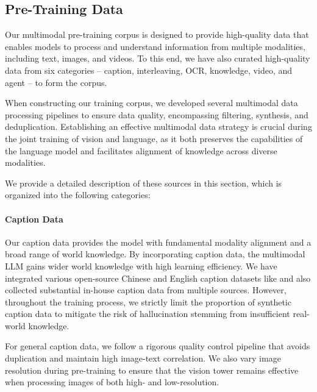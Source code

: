 \documentclass{article}
\newcommand{\citep}[1]{\parencite{#1}}
\begin{document}
\label{sec:data}


\subsection{Pre-Training Data}
\label{sec:pretraindata} %

Our multimodal pre-training corpus is designed to provide high-quality data that enables models to process and understand information from multiple modalities, including text, images, and videos. 
To this end, we have also curated high-quality data from six categories -- caption, interleaving, OCR, knowledge, video, and agent -- to form the corpus.


When constructing our training corpus, we developed several multimodal data processing pipelines to ensure data quality, encompassing filtering, synthesis, and deduplication. 
Establishing an effective multimodal data strategy is crucial during the joint training of vision and language, as it both preserves the capabilities of the language model and facilitates alignment of knowledge across diverse modalities.

We provide a detailed description of these sources in this section, which is organized into the following categories:

\paragraph{Caption Data}
Our caption data provides the model with fundamental modality alignment and a broad range of world knowledge. By incorporating caption data, the multimodal LLM gains wider world knowledge with high learning efficiency. We have integrated various open-source Chinese and English caption datasets like \citep{schuhmann2022laion, gadre2024datacomp} and also collected substantial in-house caption data from multiple sources. However, throughout the training process, we strictly limit the proportion of synthetic caption data to mitigate the risk of hallucination stemming from insufficient real-world knowledge.

For general caption data, we follow a rigorous quality control pipeline that avoids duplication and maintain high image-text correlation. We also vary image resolution during pre-training to ensure that the vision tower remains effective when processing images of both high- and low-resolution.
\end{document}
